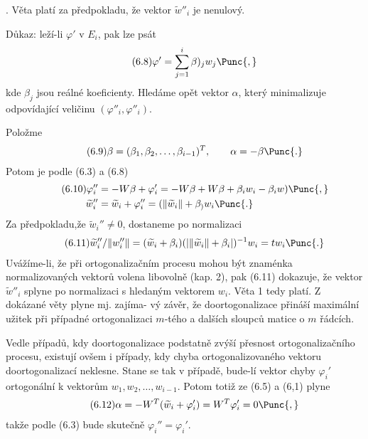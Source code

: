 .
%
Věta platí za předpokladu, že vektor $\widetilde w''_i$ je
nenulový.

Důkaz: leží-li $\varphi'$ v $E_i$, pak lze psát
%
\begin{align*}
  \tag{6.8}
  \varphi' = \sum_{j=1}^i \beta)_j w_j \Punc{,}
\end{align*}
%
kde $\beta_j$ jsou reálné koeficienty. Hledáme opět vektor $\alpha$,
který minimalizuje odpovídající veličinu $(\varphi''_i,
\varphi''_i)$.
%

\noindent Položme
\begin{align*}
  \tag{6.9}
  \beta = (\beta_1,\beta_2,\dots,\beta_{i-1})^T,
  \qquad\alpha = -\beta \Punc{.}
\end{align*}
%
Potom je podle (6.3) a (6.8)
\begin{align*}
  \tag{6.10}
  \varphi_i'' &= -W\beta + \varphi_i'
  = -W\beta + W\beta + \beta_iw_i - \beta_iw) \Punc{,}\\
  \widetilde w_i'' &= \widetilde w_i + \varphi_i'' =
  (\Vert \widetilde w_i\Vert + \beta_)w_i \Punc{.}
\end{align*}
%
Za předpokladu,že $\widetilde w_i'' \ne 0$, dostaneme po
normalizaci
%
\begin{align*}
  \tag{6.11}
  \widetilde w_i''/\Vert w_i''\Vert =
  (\widetilde w_i + \beta_i)(| \Vert\widetilde w_i\Vert + \beta_i|)^{-1}w_i
  = tw_i \Punc{.}
\end{align*}
%
Uvážíme-li, že při ortogonalizačním procesu mohou být znaménka
normalizovaných vektorů volena libovolně (kap. 2), pak (6.11)
dokazuje, že vektor $\widetilde w''_i$ splyne po normalizaci s
hledaným vektorem $w_i$. Věta 1 tedy platí. Z dokázané věty plyne
mj. zajíma- vý závěr, že doortogonalizace přináší maximální užitek při
případné ortogonalizaci $m$-tého a dalších sloupců matice o $m$
řádcích.

Vedle případů, kdy doortogonalizace podstatně zvýší přesnost
ortogonalizačního procesu, existují ovšem i případy, kdy chyba
ortogonalizovaného vektoru doortogonalizací neklesne. Stane se
%
tak  v případě, bude-lí vektor chyby $\varphi_i'$
ortogonální k vektorům $w_1,w_2,\dots,w_{i-1}$.  Potom totiž ze (6.5)
a (6,1) plyne
%
\begin{align*}
  \tag{6.12}
  \alpha  = -W^T(\widetilde w_i + \varphi_i')
  = W^T\varphi_i' = 0 \Punc{,}
\end{align*}
%
takže podle (6.3) bude skutečně $\varphi_i'' = \varphi_i'$.


